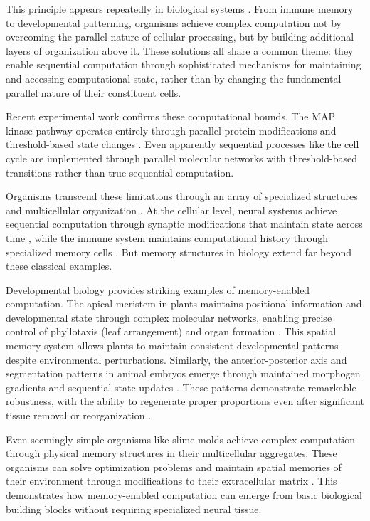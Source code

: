 \documentclass[12pt]{article}
\begin{document}
This principle appears repeatedly in biological systems \cite{fu2024memory}.
From immune memory to developmental patterning, organisms achieve complex computation not by overcoming the parallel nature of cellular processing, but by building additional layers of organization above it.
These solutions all share a common theme: they enable sequential computation through sophisticated mechanisms for maintaining and accessing computational state, rather than by changing the fundamental parallel nature of their constituent cells.

Recent experimental work confirms these computational bounds.
The MAP kinase pathway operates entirely through parallel protein modifications and threshold-based state changes \cite{alberts2022molecular}.
Even apparently sequential processes like the cell cycle are implemented through parallel molecular networks with threshold-based transitions rather than true sequential computation.

Organisms transcend these limitations through an array of specialized structures and multicellular organization \cite{espinosa2024molecular}.
At the cellular level, neural systems achieve sequential computation through synaptic modifications that maintain state across time \cite{fu2024memory}, while the immune system maintains computational history through specialized memory cells \cite{niu2022computational}.
But memory structures in biology extend far beyond these classical examples.

Developmental biology provides striking examples of memory-enabled computation.
The apical meristem in plants maintains positional information and developmental state through complex molecular networks, enabling precise control of phyllotaxis (leaf arrangement) and organ formation \cite{lovkvist2021using}.
This spatial memory system allows plants to maintain consistent developmental patterns despite environmental perturbations.
Similarly, the anterior-posterior axis and segmentation patterns in animal embryos emerge through maintained morphogen gradients and sequential state updates \cite{pastor2020computation}.
These patterns demonstrate remarkable robustness, with the ability to regenerate proper proportions even after significant tissue removal or reorganization \cite{lobo2012towards}.

Even seemingly simple organisms like slime molds achieve complex computation through physical memory structures in their multicellular aggregates.
These organisms can solve optimization problems and maintain spatial memories of their environment through modifications to their extracellular matrix \cite{hoel2020emergence}.
This demonstrates how memory-enabled computation can emerge from basic biological building blocks without requiring specialized neural tissue.
\end{document}
